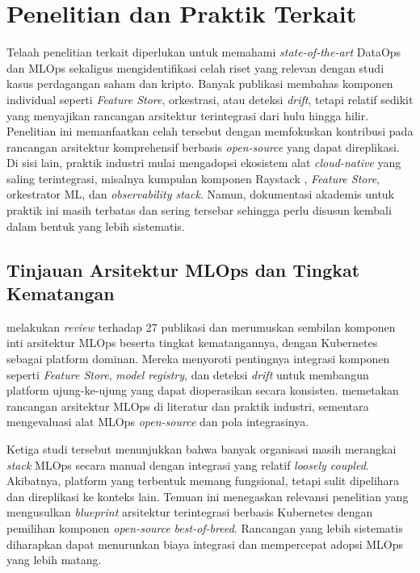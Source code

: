 \section{Penelitian dan Praktik Terkait}
\label{sec:related_work}

Telaah penelitian terkait diperlukan untuk memahami \textit{state-of-the-art} DataOps dan MLOps sekaligus mengidentifikasi celah riset yang relevan dengan studi kasus perdagangan saham dan kripto. Banyak publikasi membahas komponen individual seperti \textit{Feature Store}, orkestrasi, atau deteksi \textit{drift}, tetapi relatif sedikit yang menyajikan rancangan arsitektur terintegrasi dari hulu hingga hilir. Penelitian ini memanfaatkan celah tersebut dengan memfokuskan kontribusi pada rancangan arsitektur komprehensif berbasis \textit{open-source} yang dapat direplikasi. Di sisi lain, praktik industri mulai mengadopsi ekosistem alat \textit{cloud-native} yang saling terintegrasi, misalnya kumpulan komponen Raystack \autocite{raystack2025raccoon,raystack2025stencil,raystack2025firehose,raystack2025optimus,raystack2025dagger,raystack2025siren,raystack2025meteor,raystack2025compass,raystack2025frontier,raystack2025guardian}, \textit{Feature Store}, orkestrator ML, dan \textit{observability stack}. Namun, dokumentasi akademis untuk praktik ini masih terbatas dan sering tersebar sehingga perlu disusun kembali dalam bentuk yang lebih sistematis.

\subsection{Tinjauan Arsitektur MLOps dan Tingkat Kematangan}

\textcite{kreuzberger2023mlops} melakukan \textit{review} terhadap 27 publikasi dan merumuskan sembilan komponen inti arsitektur MLOps beserta tingkat kematangannya, dengan Kubernetes sebagai platform dominan. Mereka menyoroti pentingnya integrasi komponen seperti \textit{Feature Store}, \textit{model registry}, dan deteksi \textit{drift} untuk membangun platform ujung-ke-ujung yang dapat dioperasikan secara konsisten. \textcite{najafabadi2024analysis} memetakan rancangan arsitektur MLOps di literatur dan praktik industri, sementara \textcite{burgueno2025toward} mengevaluasi alat MLOps \textit{open-source} dan pola integrasinya.

Ketiga studi tersebut menunjukkan bahwa banyak organisasi masih merangkai \textit{stack} MLOps secara manual dengan integrasi yang relatif \textit{loosely coupled}. Akibatnya, platform yang terbentuk memang fungsional, tetapi sulit dipelihara dan direplikasi ke konteks lain. Temuan ini menegaskan relevansi penelitian yang mengusulkan \textit{blueprint} arsitektur terintegrasi berbasis Kubernetes dengan pemilihan komponen \textit{open-source} \textit{best-of-breed}. Rancangan yang lebih sistematis diharapkan dapat menurunkan biaya integrasi dan mempercepat adopsi MLOps yang lebih matang.

